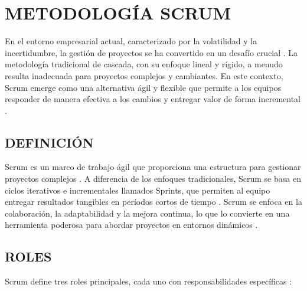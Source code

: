 \section{METODOLOGÍA SCRUM}

En el entorno empresarial actual, caracterizado por la volatilidad y la incertidumbre, la gestión de proyectos se ha convertido en un desafío crucial \autocite{sutherland2014scrum}. La metodología tradicional de cascada, con su enfoque lineal y rígido, a menudo resulta inadecuada para proyectos complejos y cambiantes. En este contexto, Scrum emerge como una alternativa ágil y flexible que permite a los equipos responder de manera efectiva a los cambios y entregar valor de forma incremental \autocite{schwaber2020guia}.

\subsection{DEFINICIÓN}

Scrum es un marco de trabajo ágil que proporciona una estructura para gestionar proyectos complejos \autocite{schwaber2020guia}. A diferencia de los enfoques tradicionales, Scrum se basa en ciclos iterativos e incrementales llamados Sprints, que permiten al equipo entregar resultados tangibles en períodos cortos de tiempo \autocite{rubin2012essential}. Scrum se enfoca en la colaboración, la adaptabilidad y la mejora continua, lo que lo convierte en una herramienta poderosa para abordar proyectos en entornos dinámicos \autocite{cohn2010suceeding}.

\subsection{ROLES}

Scrum define tres roles principales, cada uno con responsabilidades específicas \autocite{schwaber2020guia}:

